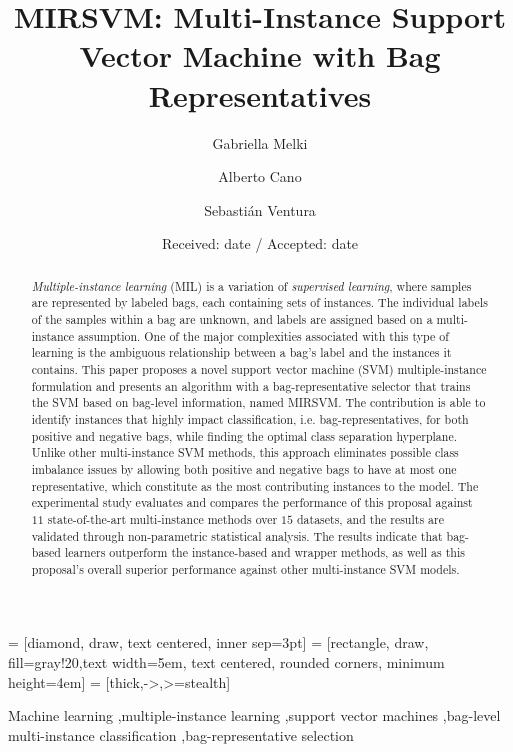 \documentclass[preprint,12pt]{elsarticle}
\begin{document}
 = [diamond, draw, text centered, inner sep=3pt]
 = [rectangle, draw, fill=gray!20,text width=5em, text centered, rounded corners, minimum height=4em]
 = [thick,->,>=stealth]

\begin{frontmatter}

\title{MIRSVM: Multi-Instance Support Vector Machine with Bag Representatives}

\author[a]{Gabriella Melki}\author[a]{Alberto Cano}\author[b,c]{Sebasti\'an Ventura}
\address[a]{Department of Computer Science, Virginia Commonwealth University, USA}
\address[b]{Department of Computer Science and Numerical Analysis, University of Cordoba, Spain}
\address[c]{Department of Computer Science, King Abdulaziz University, Saudi Arabia Kingdom}

\date{Received: date / Accepted: date}

\begin{abstract}
\textit{Multiple-instance learning} (MIL) is a variation of \textit{supervised learning}, where samples are represented by labeled bags, each containing sets of instances. The individual labels of the samples within a bag are unknown, and labels are assigned based on a multi-instance assumption. One of the major complexities associated with this type of learning is the ambiguous relationship between a bag's label and the instances it contains. This paper proposes a novel support vector machine (SVM) multiple-instance formulation and presents an algorithm with a bag-representative selector that trains the SVM based on bag-level information, named MIRSVM. The contribution is able to identify instances that highly impact classification, i.e. bag-representatives, for both positive and negative bags, while finding the optimal class separation hyperplane. Unlike other multi-instance SVM methods, this approach eliminates possible class imbalance issues by allowing both positive and negative bags to have at most one representative, which constitute as the most contributing instances to the model. The experimental study evaluates and compares the performance of this proposal against $11$ state-of-the-art multi-instance methods over $15$ datasets, and the results are validated through non-parametric statistical analysis. The results indicate that bag-based learners outperform the instance-based and wrapper methods, as well as this proposal's overall superior performance against other multi-instance SVM models. 
\end{abstract}

\begin{keyword}
Machine learning \sep multiple-instance learning \sep support vector machines \sep bag-level multi-instance classification \sep bag-representative selection
\end{keyword}

\end{frontmatter}
\end{document}
